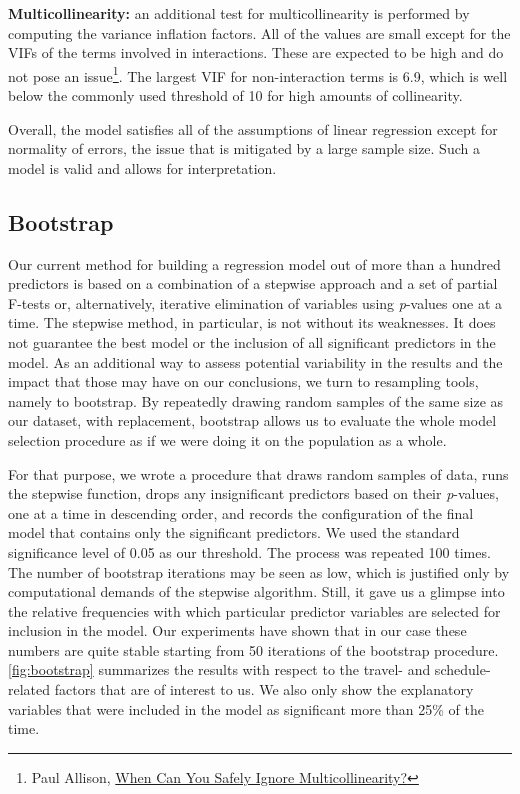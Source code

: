 \documentclass[
    12pt,
    a4paper,
    titlepage,  %
    abstract,  %
    headings=standardclasses,  %
    bibliography=totocnumbered  %
]{scrartcl}
\begin{document}
\textbf{Multicollinearity:} an additional test for multicollinearity is performed by computing the variance inflation factors. All of the values are small except for the VIFs of the terms involved in interactions. These are expected to be high and do not pose an issue\footnote{Paul Allison, \href{https://statisticalhorizons.com/multicollinearity}{When Can You Safely Ignore Multicollinearity?}}. The largest VIF for non-interaction terms is 6.9, which is well below the commonly used threshold of 10 for high amounts of collinearity.

Overall, the model satisfies all of the assumptions of linear regression except for normality of errors, the issue that is mitigated by a large sample size. Such a model is valid and allows for interpretation.

\subsection{Bootstrap}

Our current method for building a regression model out of more than a hundred predictors is based on a combination of a stepwise approach and a set of partial F-tests or, alternatively, iterative elimination of variables using \emph{p}-values one at a time. The stepwise method, in particular, is not without its weaknesses. It does not guarantee the best model or the inclusion of all significant predictors in the model. As an additional way to assess potential variability in the results and the impact that those may have on our conclusions, we turn to resampling tools, namely to bootstrap. By repeatedly drawing random samples of the same size as our dataset, with replacement, bootstrap allows us to evaluate the whole model selection procedure as if we were doing it on the population as a whole.

For that purpose, we wrote a procedure that draws random samples of data, runs the stepwise function, drops any insignificant predictors based on their \emph{p}-values, one at a time in descending order, and records the configuration of the final model that contains only the significant predictors. We used the standard significance level of 0.05 as our threshold. The process was repeated 100 times. The number of bootstrap iterations may be seen as low, which is justified only by computational demands of the stepwise algorithm. Still, it gave us a glimpse into the relative frequencies with which particular predictor variables are selected for inclusion in the model. Our experiments have shown that in our case these numbers are quite stable starting from 50 iterations of the bootstrap procedure. \autoref{fig:bootstrap} summarizes the results with respect to the travel- and schedule-related factors that are of interest to us. We also only show the explanatory variables that were included in the model as significant more than 25\% of the time.
\end{document}
